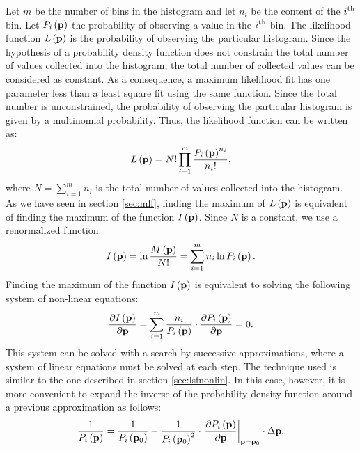 \documentclass[twoside]{book}
\begin{document}
Let $m$ be the number of bins in the histogram and let $n_i$ be
the content of the $i^{\mathop{\rm th}}$ bin. Let $P_i\left({\bf
p}\right)$ the probability of observing a value in the
$i^{\mathop{\rm th}}$ bin. The likelihood function $L\left({\bf
p}\right)$ is the probability of observing the particular
histogram. Since the hypothesis of a probability density function
does not constrain the total number of values collected into the
histogram, the total number of collected values can be considered
as constant. As a consequence, a maximum likelihood fit has one
parameter less than a least square fit using the same function.
Since the total number is unconstrained, the probability of
observing the particular histogram is given by a multinomial
probability. Thus, the likelihood function can be written as:
\begin{equation}
\label{eq:mlfhist}
  L\left({\bf p}\right)=N!\prod_{i=1}^m{\displaystyle P_i\left({\bf
  p}\right)^{n_i}\over\displaystyle n_i!},
\end{equation}
where $N=\sum_{i=1}^m n_i$ is the total number of values collected
into the histogram. As we have seen in section \ref{sec:mlf},
finding the maximum of $L\left({\bf p}\right)$ is equivalent of
finding the maximum of the function $I\left({\bf p}\right)$. Since
$N$ is a constant, we use a renormalized function:
\begin{equation}
\label{eq:mlogfhist} I\left({\bf p}\right)=\ln {\displaystyle
M\left({\bf p}\right) \over\displaystyle N!}=\sum_{i=1}^m n_i \ln
P_i\left({\bf p}\right).
\end{equation}
Finding the maximum of the function $I\left({\bf p}\right)$ is
equivalent to solving the following system of non-linear
equations:
\begin{equation}
\label{eq:mlfsys} {\displaystyle\partial I\left({\bf p}\right)
\over\displaystyle\partial{\bf p}}=\sum_{i=1}^m {\displaystyle n_i
\over\displaystyle P_i\left({\bf
p}\right)}\cdot{\displaystyle\partial P_i\left({\bf p}\right)
\over\displaystyle\partial{\bf p}}=0.
\end{equation}
This system can be solved with a search by successive
approximations, where a system of linear equations must be solved
at each step. The technique used is similar to the one described
in section \ref{sec:lsfnonlin}. In this case, however, it is more
convenient to expand the inverse of the probability density
function around a previous approximation as follows:
\begin{equation}
{\displaystyle 1\over\displaystyle P_i\left({\bf p}\right)} =
{\displaystyle 1\over\displaystyle P_i\left({\bf p}_0\right)} -
{\displaystyle 1\over\displaystyle P_i\left({\bf
p}_0\right)^2}\cdot \left.{\displaystyle\partial P_i\left({\bf
p}\right) \over\displaystyle\partial{\bf p}}\right|_{{\bf p}={\bf
p}_0}\cdot\Delta{\bf p}.
\end{equation}
\end{document}
